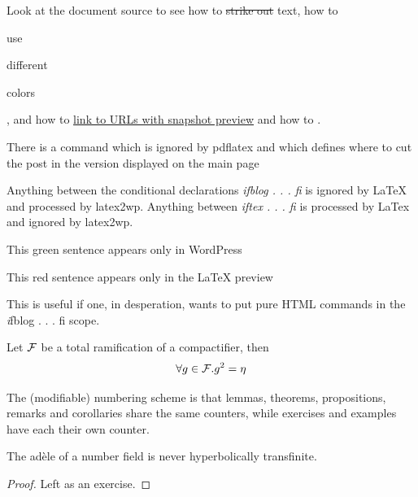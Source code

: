 \documentclass[12pt]{article}
\begin{document}
Look at the document source to see how to \sout{strike out} text, how
to \begin{red}use\end{red} \begin{green}different\end{green} \begin{blue}colors\end{blue},
and how to \href{http://www.google.com}{link to URLs with snapshot preview}
and how to .

There is a command which is ignored by pdflatex and which 
defines where to cut the post in the version displayed on the
main page\more

Anything between the conditional declarations {\em ifblog . . . fi}
is ignored by LaTeX and processed by latex2wp. Anything
between {\em iftex . . . fi} is processed by LaTex and ignored
by latex2wp.

\ifblog \begin{green}This green sentence appears only in WordPress \end{green} \fi

\iftex \begin{red}This red sentence appears only in the LaTeX preview \end{red} \fi

This is useful if one, in desperation, wants to put pure HTML commands
in the {\emph ifblog . . . fi} scope.


\begin{lemma}[Main] \label{lm:main}
Let $\cal F$ be a total ramification of a compactifier, then
\begin{equation} \label{eq:lemma} \forall g \in {\cal F}. g^2 = \eta \end{equation}
\end{lemma}

The  (modifiable) numbering scheme is that lemmas, theorems, 
propositions, remarks and corollaries share the same counters,
while exercises and examples have each their own counter.

\begin{theorem} \label{th:ad} The ad\`ele of a number field is never
hyperbolically transfinite.
\end{theorem}

\begin{proof} Left as an exercise. \end{proof}
\end{document}
